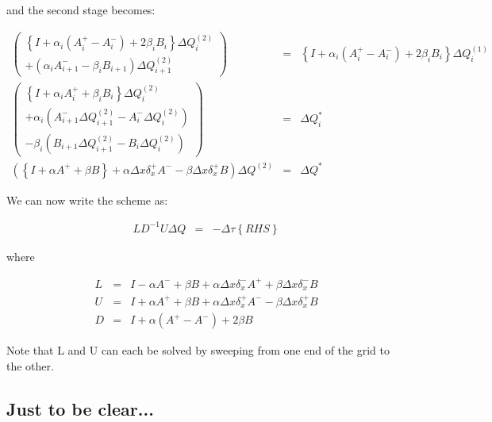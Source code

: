 and the second stage becomes:

\begin{eqnarray}
\left(
\begin{array}{c}
\left\{
I + \alpha_i \left(
A_i^+ 
-A_i^- 
\right)
+ 2 \beta_i B_i
\right\}
\Delta Q^{\left(2 \right)}_i
\\
+ \left( 
\alpha_i A^-_{i+1}  
-
\beta_i B_{i+1} 
\right)
\Delta Q^{\left(2 \right)}_{i+1}
\end{array}
\right)
&=&
\left\{
I + \alpha_i \left(
A_i^+ 
- A_i^- 
\right)
+ 2 \beta_i B_i
\right\}
\Delta Q^{\left(1 \right)}_i
\nonumber
\\
\left(
\begin{array}{c}
\left\{
I + \alpha_i 
A_i^+ 
+ \beta_i B_i
\right\}
\Delta Q^{\left(2 \right)}_i
\\
+ 
\alpha_i
\left( 
A^-_{i+1}  
\Delta Q^{\left(2 \right)}_{i+1}
-A_i^- 
\Delta Q^{\left(2 \right)}_i
\right)
\\
- 
\beta_i
\left( 
B_{i+1} 
\Delta Q^{\left(2 \right)}_{i+1}
-
B_i
\Delta Q^{\left(2 \right)}_i
\right)
\end{array}
\right)
&=&
\Delta Q^{*}_i
\nonumber
\\
\left(
\left\{
I + \alpha 
A^+ 
+ \beta B
\right\}
+ 
\alpha \Delta x
\delta^+_x
A^-
-
\beta \Delta x
\delta^+_x
B
\right)
\Delta Q^{\left(2 \right)}
&=&
\Delta Q^{*}
\nonumber
\end{eqnarray}

We can now write the scheme as:

\begin{eqnarray}
L D^{-1} U \Delta Q &=& 
-\Delta \tau \left\{RHS \right\}
\nonumber
\end{eqnarray}

where

\begin{eqnarray}
L &=& 
I - \alpha A^- + \beta B 
+ \alpha \Delta x \delta_x^- A^+
+ \beta \Delta x \delta_x^- B
\nonumber
\\
U &=& 
I + \alpha A^+ + \beta B
+ \alpha \Delta x \delta_x^+ A^-
- \beta \Delta x \delta_x^+ B
\nonumber
\\
D &=& 
I + \alpha \left(A^+ - A^- \right) + 2 \beta B
\nonumber
\end{eqnarray}

Note that L and U can each be solved by sweeping from one end of the grid
to the other. 

\subsection{Just to be clear...}

